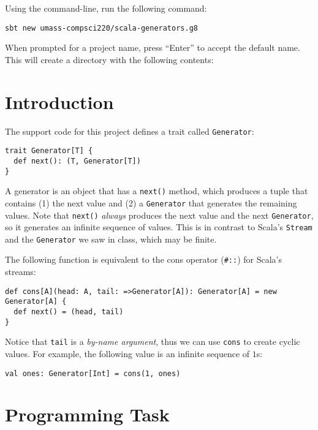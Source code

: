 \documentclass[9pt]{extbook}
\begin{document}
Using the command-line, run the following command:

\begin{lstlisting}
sbt new umass-compsci220/scala-generators.g8
\end{lstlisting}

When prompted for a project name, press ``Enter'' to accept the default name.
This will create a directory with the following contents:


\section{Introduction}

The support code for this project defines a trait called \lstinline|Generator|:

\begin{lstlisting}
trait Generator[T] {
  def next(): (T, Generator[T])
}
\end{lstlisting}

A generator is an object that has a \lstinline|next()| method, which produces
a tuple that contains (1) the next value and (2) a \lstinline|Generator| that generates
the remaining values. Note that \lstinline|next()| \emph{always} produces the next
value and the next \lstinline|Generator|, so it generates an infinite sequence
of values. This is in contrast to
Scala's \lstinline|Stream| and the \lstinline|Generator| we saw in class,
which may be finite.

The following function is equivalent to the cons operator (\lstinline|#::|)
for Scala's streams:
\begin{lstlisting}
def cons[A](head: A, tail: =>Generator[A]): Generator[A] = new Generator[A] {
  def next() = (head, tail)
}
\end{lstlisting}

Notice that \lstinline|tail| is a \emph{by-name argument}, thus we can use
\lstinline|cons| to create cyclic values. For example, the following value
is an infinite sequence of $1$s:
\begin{lstlisting}
val ones: Generator[Int] = cons(1, ones)
\end{lstlisting}

\section{Programming Task}
\end{document}
